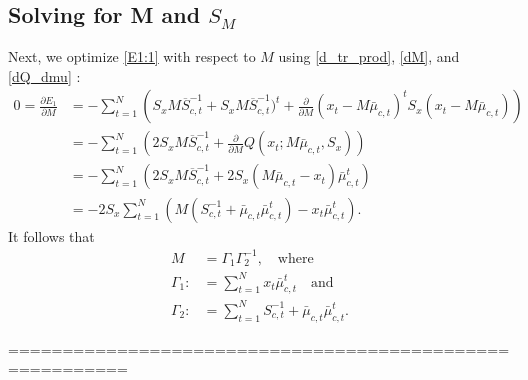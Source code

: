 \documentclass[12pt,leqno]{article}
\begin{document}
\subsection{Solving for M and $S_M$}
Next, we optimize \eqref{E1:1} with respect to $M$ using %
\eqref{d_tr_prod}, \eqref{dM}, and \eqref{dQ_dmu} :
\begin{equation}\label{M:0}
\begin{split}
  0 = \frac{\partial{E_1}}{\partial{M}} &= -\sum_{t=1}^N  \left(S_xM\overline{S}_{c,t}^{-1} + S_xM\overline{S}_{c,t}^{-1})^t + \frac{\partial}{\partial{M}}(x_t-M\bar{\mu}_{c,t})^tS_x(x_t-M\bar{\mu}_{c,t})\right) \\
  &= -\sum_{t=1}^N  \left(2S_xM\overline{S}_{c,t}^{-1}  + \frac{\partial}{\partial{M}}Q(x_t;M\bar{\mu}_{c,t},S_x)\right)\\
  &= -\sum_{t=1}^N  \left(2S_xM\overline{S}_{c,t}^{-1}  + 2S_x(M\bar{\mu}_{c,t} - x_t)\bar{\mu}_{c,t}^t\right)\\
  &= -2S_x\sum_{t=1}^N\left(M(S_{c,t}^{-1}+\bar{\mu}_{c,t}\bar{\mu}_{c,t}^t) - x_t\bar{\mu}_{c,t}^t\right).
\end{split}
\end{equation}
It follows that
\begin{equation}\label{M}
  \begin{split}
    M &= \Gamma_1\Gamma_2^{-1}, \quad\text{where}\\
    \Gamma_1 :&= \sum_{t=1}^N x_t\bar{\mu}_{c,t}^t\quad\text{and}\\
    \Gamma_2 :&= \sum_{t=1}^N S_{c,t}^{-1}+ \bar{\mu}_{c,t}\bar{\mu}_{c,t}^t.
  \end{split}
\end{equation}












=========================================================
\end{document}
